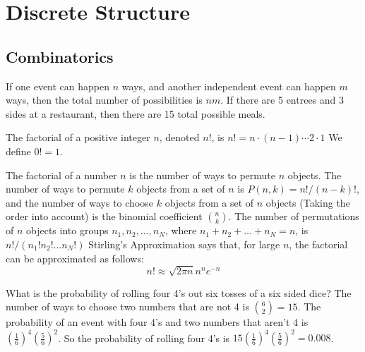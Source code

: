 \chapter{Discrete Structure}
    \section{Combinatorics}
        If one event can happen $n$ ways, and another independent
        event can happen $m$ ways, then the total number
        of possibilities is $nm$. If there are 5 entrees
        and 3 sides at a restaurant, then there are
        15 total possible meals.
        \begin{definition}
            The factorial of a positive integer $n$, denoted $n!$, is
            $n!=n\cdot(n-1)\cdots{2}\cdot{1}$ We define $0!=1$.
        \end{definition}
        The factorial of a number $n$ is the number of ways to permute $n$
        objects. The number of ways to permute $k$ objects from a set of $n$ is
        $P(n,k)=n!/(n-k)!$, and the number of ways to choose $k$ objects from a
        set of $n$ objects (Taking the order into account) is the binomial
        coefficient $\binom{n}{k}$. The number of permutations of $n$ objects
        into groups $n_{1},n_{2},\hdots,n_{N}$, where
        $n_{1}+n_{2}+\hdots+n_{N}=n$, is $n!/(n_{1}!n_{2}!\hdots{n_{N}!})$
        Stirling's Approximation says that, for large $n$, the factorial can be
        approximated as follows:
        \begin{equation}
            n!\approx\sqrt{2\pi{n}}n^{n}e^{-n}
        \end{equation}
        \begin{example}
            What is the probability of rolling four 4's out six tosses of a six
            sided dice? The number of ways to choose two numbers that are not 4
            is $\binom{6}{2}=15$. The probability of an event with four 4's and
            two numbers that aren't 4 is $(\frac{1}{6})^{4}(\frac{5}{6})^{2}$.
            So the probability of rolling four 4's is
            $15(\frac{1}{6})^{4}(\frac{5}{6})^{2}=0.008$.
        \end{example}

